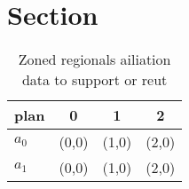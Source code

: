 \documentclass[a4paper]{article}
\begin{document}
\section{Section}

\begin{table}
\begin{adjustbox}{width=0.5\columnwidth}
\begin{tabular}{|l|l|l|l|}
\hline
\textbf{plan} & \multicolumn{1}{c|}{\textbf{0}} & \multicolumn{1}{c|}{\textbf{1}} & \multicolumn{1}{c|}{\textbf{2}} \\ \hline
\textbf{$a_0$}  & (0,0) & (1,0) & (2,0) \\ \hline
\textbf{$a_1$}  & (0,0) & (1,0) & (2,0) \\ \hline
\end{tabular}
\end{adjustbox}
\caption{Zoned regionals ailiation data to support or reut
}
\end{table}
\end{document}
